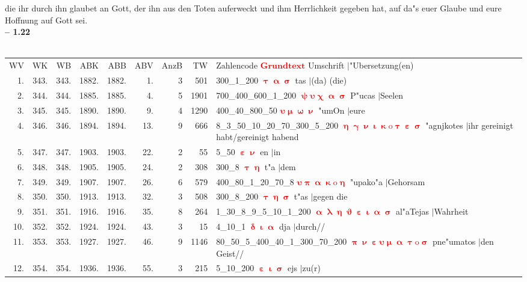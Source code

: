 \documentclass[a4paper,10pt,landscape]{article}
\begin{document}
die ihr durch ihn glaubet an Gott, der ihn aus den Toten auferweckt und ihm Herrlichkeit gegeben hat, auf da"s euer Glaube und eure Hoffnung auf Gott sei.\\
\newpage 
{\bf -- 1.22}\\
\medskip \\
\begin{tabular}{rrrrrrrrp{120mm}}
WV&WK&WB&ABK&ABB&ABV&AnzB&TW&Zahlencode \textcolor{red}{$\boldsymbol{Grundtext}$} Umschrift $|$"Ubersetzung(en)\\
1.&343.&343.&1882.&1882.&1.&3&501&300\_1\_200 \textcolor{red}{$\boldsymbol{\uptau\upalpha\upsigma}$} tas $|$(da) (die)\\
2.&344.&344.&1885.&1885.&4.&5&1901&700\_400\_600\_1\_200 \textcolor{red}{$\boldsymbol{\uppsi\upsilon\upchi\upalpha\upsigma}$} P"ucas $|$Seelen\\
3.&345.&345.&1890.&1890.&9.&4&1290&400\_40\_800\_50 \textcolor{red}{$\boldsymbol{\upsilon\upmu\upomega\upnu}$} "umOn $|$eure\\
4.&346.&346.&1894.&1894.&13.&9&666&8\_3\_50\_10\_20\_70\_300\_5\_200 \textcolor{red}{$\boldsymbol{\upeta\upgamma\upnu\upiota\upkappa\mathrm{o}\uptau\upepsilon\upsigma}$} "agnjkotes $|$ihr gereinigt habt/gereinigt habend\\
5.&347.&347.&1903.&1903.&22.&2&55&5\_50 \textcolor{red}{$\boldsymbol{\upepsilon\upnu}$} en $|$in\\
6.&348.&348.&1905.&1905.&24.&2&308&300\_8 \textcolor{red}{$\boldsymbol{\uptau\upeta}$} t"a $|$dem\\
7.&349.&349.&1907.&1907.&26.&6&579&400\_80\_1\_20\_70\_8 \textcolor{red}{$\boldsymbol{\upsilon\uppi\upalpha\upkappa\mathrm{o}\upeta}$} "upako"a $|$Gehorsam\\
8.&350.&350.&1913.&1913.&32.&3&508&300\_8\_200 \textcolor{red}{$\boldsymbol{\uptau\upeta\upsigma}$} t"as $|$gegen die\\
9.&351.&351.&1916.&1916.&35.&8&264&1\_30\_8\_9\_5\_10\_1\_200 \textcolor{red}{$\boldsymbol{\upalpha\uplambda\upeta\upvartheta\upepsilon\upiota\upalpha\upsigma}$} al"aTejas $|$Wahrheit\\
10.&352.&352.&1924.&1924.&43.&3&15&4\_10\_1 \textcolor{red}{$\boldsymbol{\updelta\upiota\upalpha}$} dja $|$durch//\\
11.&353.&353.&1927.&1927.&46.&9&1146&80\_50\_5\_400\_40\_1\_300\_70\_200 \textcolor{red}{$\boldsymbol{\uppi\upnu\upepsilon\upsilon\upmu\upalpha\uptau\mathrm{o}\upsigma}$} pne"umatos $|$den Geist//\\
12.&354.&354.&1936.&1936.&55.&3&215&5\_10\_200 \textcolor{red}{$\boldsymbol{\upepsilon\upiota\upsigma}$} ejs $|$zu(r)\\

\end{tabular}
\end{document}
